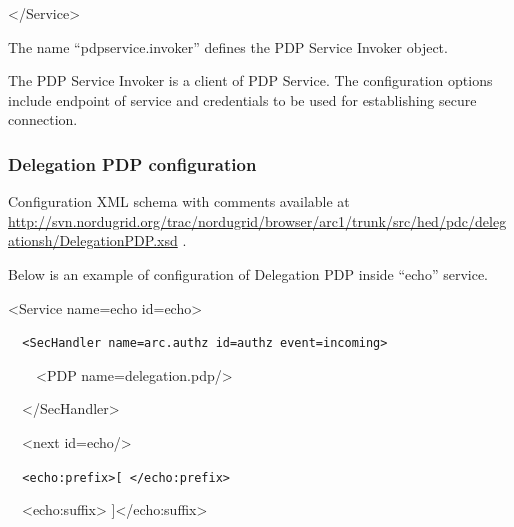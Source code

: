 \documentclass[a4paper]{article}
\begin{document}
{\ttfamily\color{black}
{\textless}/Service{\textgreater}}

{\upshape\color{black}
The name {\textquotedblleft}pdpservice.invoker{\textquotedblright}
defines the PDP Service Invoker object.}

{\color{black}
The PDP Service Invoker is a client of PDP Service. The configuration
options include endpoint of service and credentials to be used for
establishing secure connection.}


\bigskip

\subsubsection{Delegation PDP configuration}
{\upshape\color{black}
Configuration XML schema with comments available at
\url{http://svn.nordugrid.org/trac/nordugrid/browser/arc1/trunk/src/hed/pdc/delegationsh/DelegationPDP.xsd}
.}

{\upshape\color{black}
Below is an example of configuration of Delegation PDP inside
{\textquotedblleft}echo{\textquotedblright} service.}

{\ttfamily\color{black}
{\textless}Service name={\textquotedbl}echo{\textquotedbl}
id={\textquotedbl}echo{\textquotedbl}{\textgreater}}

{\upshape\color{black}
\foreignlanguage{spanish}{\texttt{\ \ }}\texttt{{\textless}SecHandler
name={\textquotedbl}arc.authz{\textquotedbl}
id={\textquotedbl}authz{\textquotedbl}
event={\textquotedbl}incoming{\textquotedbl}{\textgreater}}}

{\ttfamily\color{black}
\ \ \ \ {\textless}PDP
name={\textquotedbl}delegation.pdp{\textquotedbl}/{\textgreater}}

{\ttfamily\color{black}
\ \ {\textless}/SecHandler{\textgreater}}

{\ttfamily\color{black}
\ \ {\textless}next
id={\textquotedbl}echo{\textquotedbl}/{\textgreater}}

{\upshape\color{black}
\texttt{\ \ }\foreignlanguage{spanish}{\texttt{{\textless}echo:prefix{\textgreater}[
{\textless}/echo:prefix{\textgreater}}}}

{\ttfamily\color{black}
\ \ {\textless}echo:suffix{\textgreater}
]{\textless}/echo:suffix{\textgreater}}
\end{document}
